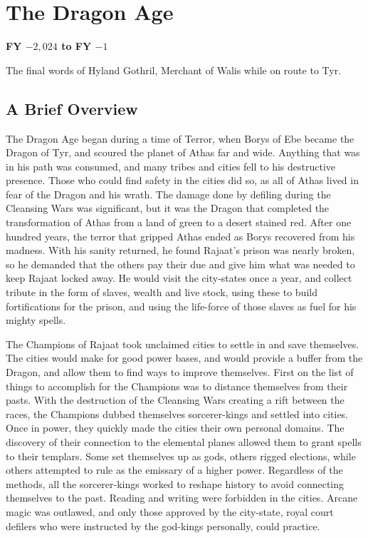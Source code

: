 \section{The Dragon Age}
\textbf{FY $-2,024$ to FY $-1$}

{The final words of Hyland Gothril, Merchant of Walis while on route to Tyr.}

\subsection{A Brief Overview}
The Dragon Age began during a time of Terror, when Borys of Ebe became the Dragon of Tyr, and scoured the planet of Athas far and wide. Anything that was in his path was consumed, and many tribes and cities fell to his destructive presence. Those who could find safety in the cities did so, as all of Athas lived in fear of the Dragon and his wrath. The damage done by defiling during the Cleansing Wars was significant, but it was the Dragon that completed the transformation of Athas from a land of green to a desert stained red. After one hundred years, the terror that gripped Athas ended as Borys recovered from his madness. With his sanity returned, he found Rajaat's prison was nearly broken, so he demanded that the others pay their due and give him what was needed to keep Rajaat locked away. He would visit the city-states once a year, and collect tribute in the form of slaves, wealth and live stock, using these to build fortifications for the prison, and using the life-force of those slaves as fuel for his mighty spells.

The Champions of Rajaat took unclaimed cities to settle in and save themselves. The cities would make for good power bases, and would provide a buffer from the Dragon, and allow them to find ways to improve themselves. First on the list of things to accomplish for the Champions was to distance themselves from their pasts. With the destruction of the Cleansing Wars creating a rift between the races, the Champions dubbed themselves sorcerer-kings and settled into cities. Once in power, they quickly made the cities their own personal domains. The discovery of their connection to the elemental planes allowed them to grant spells to their templars. Some set themselves up as gods, others rigged elections, while others attempted to rule as the emissary of a higher power. Regardless of the methods, all the sorcerer-kings worked to reshape history to avoid connecting themselves to the past. Reading and writing were forbidden in the cities. Arcane magic was outlawed, and only those approved by the city-state, royal court defilers who were instructed by the god-kings personally, could practice.

